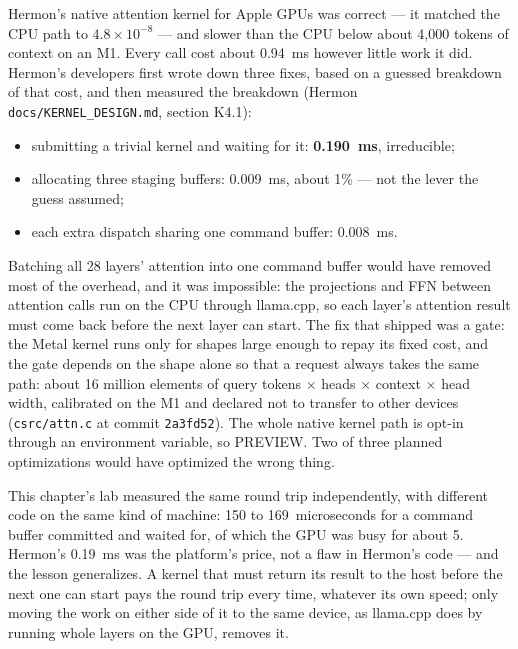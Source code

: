 Hermon's native attention kernel for Apple GPUs was correct --- it matched the
CPU path to $4.8\times10^{-8}$ --- and slower than the CPU below about 4,000
tokens of context on an M1. Every call cost about 0.94~ms however little work
it did. Hermon's developers first wrote down three fixes, based on a guessed
breakdown of that cost, and then measured the breakdown
(Hermon \texttt{docs/KERNEL\_DESIGN.md}, section K4.1):
\begin{itemize}
\item submitting a trivial kernel and waiting for it: \textbf{0.190~ms},
irreducible;
\item allocating three staging buffers: 0.009~ms, about 1\% --- not the lever
the guess assumed;
\item each extra dispatch sharing one command buffer: 0.008~ms.
\end{itemize}
Batching all 28 layers' attention into one command buffer would have removed
most of the overhead, and it was impossible: the projections and FFN between
attention calls run on the CPU through llama.cpp, so each layer's attention
result must come back before the next layer can start. The fix that shipped
was a gate: the Metal kernel runs only for shapes large enough to repay its
fixed cost, and the gate depends on the shape alone so that a request always
takes the same path: about 16 million elements of query tokens $\times$
heads $\times$ context $\times$ head width, calibrated on the M1 and declared
not to transfer to other devices (\texttt{csrc/attn.c} at commit
\texttt{2a3fd52}). The whole native kernel path is opt-in through an
environment variable, so PREVIEW. Two of three planned optimizations would have
optimized the wrong thing.

This chapter's lab measured the same round trip independently, with different
code on the same kind of machine: 150 to 169~microseconds for a command buffer
committed and waited for, of which the GPU was busy for about 5. Hermon's
0.19~ms was the platform's price, not a flaw in Hermon's code --- and the
lesson generalizes. A kernel that must return its result to the host before the
next one can start pays the round trip every time, whatever its own speed;
only moving the work on either side of it to the same device, as llama.cpp
does by running whole layers on the GPU, removes it.


